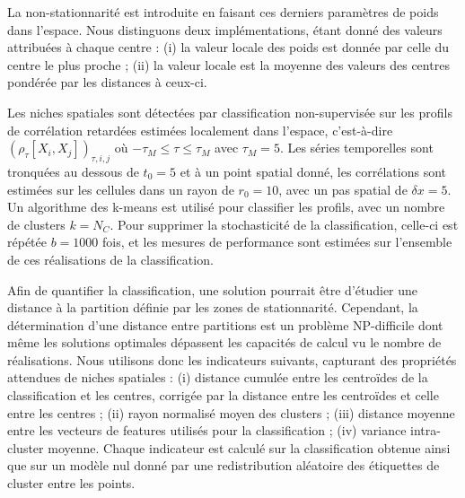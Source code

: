 \documentclass[11pt]{article}
\begin{document}

La non-stationnarité est introduite en faisant ces derniers paramètres de poids dans l'espace. Nous distinguons deux implémentations, étant donné des valeurs attribuées à chaque centre : (i) la valeur locale des poids est donnée par celle du centre le plus proche ; (ii) la valeur locale est la moyenne des valeurs des centres pondérée par les distances à ceux-ci.

Les niches spatiales sont détectées par classification non-supervisée sur les profils de corrélation retardées estimées localement dans l'espace, c'est-à-dire $(\rho_{\tau}\left[X_i,X_j\right])_{\tau,i,j}$ où $- \tau_M \leq \tau \leq  \tau_M$ avec $\tau_M = 5$. Les séries temporelles sont tronquées au dessous de $t_0 = 5$ et à un point spatial donné, les corrélations sont estimées sur les cellules dans un rayon de $r_0 = 10$, avec un pas spatial de $\delta x = 5$. Un algorithme des k-means est utilisé pour classifier les profils, avec un nombre de clusters $k = N_C$. Pour supprimer la stochasticité de la classification, celle-ci est répétée $b = 1000$ fois, et les mesures de performance sont estimées sur l'ensemble de ces réalisations de la classification.

Afin de quantifier la classification, une solution pourrait être d'étudier une distance à la partition définie par les zones de stationnarité. Cependant, la détermination d'une distance entre partitions est un problème NP-difficile \citep{day1981complexity} dont même les solutions optimales \citep{porumbel2011efficient} dépassent les capacités de calcul vu le nombre de réalisations. Nous utilisons donc les indicateurs suivants, capturant des propriétés attendues de niches spatiales : (i) distance cumulée entre les centroïdes de la classification et les centres, corrigée par la distance entre les centroïdes et celle entre les centres %
 ; (ii) rayon normalisé moyen des clusters ; (iii) distance moyenne entre les vecteurs de features utilisés pour la classification ; (iv) variance intra-cluster moyenne. Chaque indicateur est calculé sur la classification obtenue ainsi que sur un modèle nul donné par une redistribution aléatoire des étiquettes de cluster entre les points.
 
\end{document}
